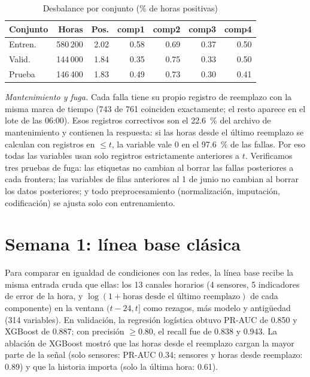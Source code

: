\documentclass[conference,letterpaper]{IEEEtran}
\begin{document}
\begin{table}[t]
\centering
\caption{Desbalance por conjunto (\% de horas positivas)}
\label{tab:desbalance}
\begin{tabular}{lrrrrrr}
\toprule
Conjunto & Horas & Pos. & comp1 & comp2 & comp3 & comp4 \\
\midrule
Entren. & 580\,200 & 2.02 & 0.58 & 0.69 & 0.37 & 0.50 \\
Valid. & 144\,000 & 1.84 & 0.35 & 0.75 & 0.33 & 0.50 \\
Prueba & 146\,400 & 1.83 & 0.49 & 0.73 & 0.30 & 0.41 \\
\bottomrule
\end{tabular}
\end{table}

\textit{Mantenimiento y fuga.} Cada falla tiene su propio registro de reemplazo con la misma marca de tiempo (743 de 761 coinciden exactamente; el resto aparece en el lote de las 06:00). Esos registros correctivos son el 22.6~\% del archivo de mantenimiento y contienen la respuesta: si las horas desde el último reemplazo se calculan con registros en $\le t$, la variable vale 0 en el 97.6~\% de las fallas. Por eso todas las variables usan solo registros estrictamente anteriores a $t$. Verificamos tres pruebas de fuga: las etiquetas no cambian al borrar las fallas posteriores a cada frontera; las variables de filas anteriores al 1 de junio no cambian al borrar los datos posteriores; y todo preprocesamiento (normalización, imputación, codificación) se ajusta solo con entrenamiento.

\section{Semana 1: línea base clásica}\label{sec:w1}
Para comparar en igualdad de condiciones con las redes, la línea base recibe la misma entrada cruda que ellas: los 13 canales horarios (4 sensores, 5 indicadores de error de la hora, y $\log(1+\text{horas desde el último reemplazo})$ de cada componente) en la ventana $(t-24, t]$ como rezagos, más modelo y antigüedad (314 variables). En validación, la regresión logística obtuvo PR-AUC de 0.850 y XGBoost de 0.887; con precisión $\ge 0.80$, el recall fue de 0.838 y 0.943. La ablación de XGBoost mostró que las horas desde el reemplazo cargan la mayor parte de la señal (solo sensores: PR-AUC 0.34; sensores y horas desde reemplazo: 0.89) y que la historia importa (solo la última hora: 0.61).
\end{document}

